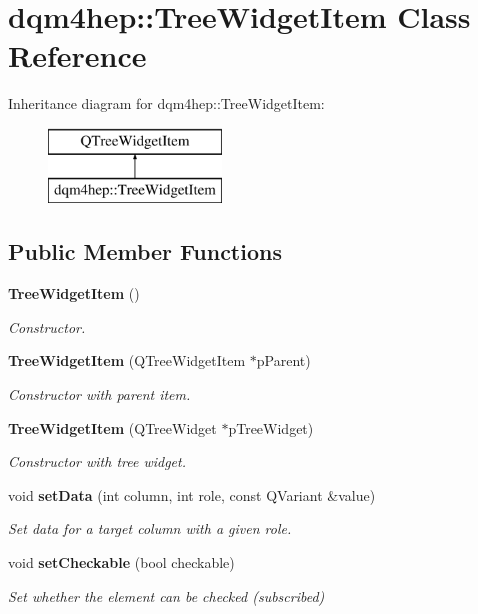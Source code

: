 \section{dqm4hep\+:\+:Tree\+Widget\+Item Class Reference}
\label{classdqm4hep_1_1TreeWidgetItem}
Inheritance diagram for dqm4hep\+:\+:Tree\+Widget\+Item\+:\begin{figure}[H]
\begin{center}
\leavevmode
\includegraphics[height=2.000000cm]{classdqm4hep_1_1TreeWidgetItem}
\end{center}
\end{figure}
\subsection*{Public Member Functions}
\begin{DoxyCompactItemize}
\item 
{\bf Tree\+Widget\+Item} ()
\begin{DoxyCompactList}\small\item\em Constructor. \end{DoxyCompactList}\item 
{\bf Tree\+Widget\+Item} (Q\+Tree\+Widget\+Item $\ast$p\+Parent)
\begin{DoxyCompactList}\small\item\em Constructor with parent item. \end{DoxyCompactList}\item 
{\bf Tree\+Widget\+Item} (Q\+Tree\+Widget $\ast$p\+Tree\+Widget)
\begin{DoxyCompactList}\small\item\em Constructor with tree widget. \end{DoxyCompactList}\item 
void {\bf set\+Data} (int column, int role, const Q\+Variant \&value)
\begin{DoxyCompactList}\small\item\em Set data for a target column with a given role. \end{DoxyCompactList}\item 
void {\bf set\+Checkable} (bool checkable)
\begin{DoxyCompactList}\small\item\em Set whether the element can be checked (subscribed) \end{DoxyCompactList}\end{DoxyCompactItemize}
